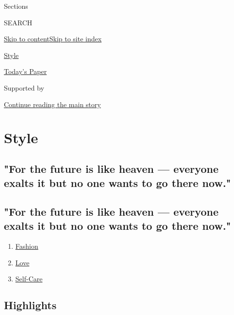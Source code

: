 Sections

SEARCH

\protect\hyperlink{site-content}{Skip to
content}\protect\hyperlink{site-index}{Skip to site index}

\href{https://www.nytimes.com/section/style}{Style}

\href{https://myaccount.nytimes.com/auth/login?response_type=cookie\&client_id=vi}{}

\href{https://www.nytimes.com/section/todayspaper}{Today's Paper}

Supported by

\protect\hyperlink{after-sponsor}{Continue reading the main story}

\hypertarget{style}{%
\section{Style}\label{style}}

\hypertarget{for-the-future-is-like-heaven--everyone-exalts-it-but-no-one-wants-to-go-there-now}{%
\subsection{"For the future is like heaven --- everyone exalts it but no
one wants to go there
now."}\label{for-the-future-is-like-heaven--everyone-exalts-it-but-no-one-wants-to-go-there-now}}

\hypertarget{for-the-future-is-like-heaven--everyone-exalts-it-but-no-one-wants-to-go-there-now-1}{%
\subsection{"For the future is like heaven --- everyone exalts it but no
one wants to go there
now."}\label{for-the-future-is-like-heaven--everyone-exalts-it-but-no-one-wants-to-go-there-now-1}}

\begin{enumerate}
\def\labelenumi{\arabic{enumi}.}
\tightlist
\item
  \href{/section/fashion}{Fashion}
\item
  \href{/section/style/love}{Love}
\item
  \href{/section/style/self-care}{Self-Care}
\end{enumerate}

\hypertarget{highlights}{%
\subsection{Highlights}\label{highlights}}

